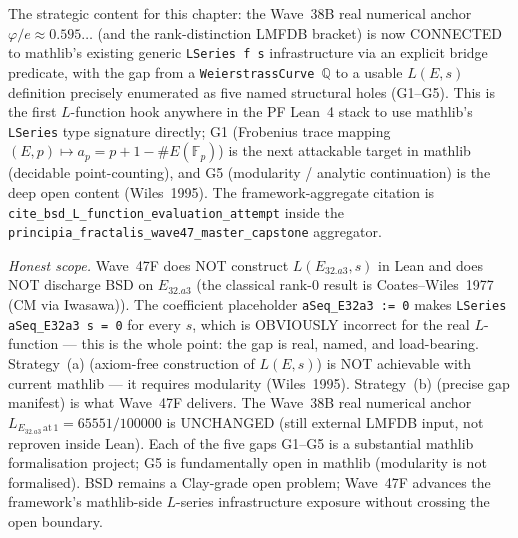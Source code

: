 \begin{remark}
\begin{itemize}
\end{itemize}
The strategic content for this chapter: the Wave~38B real numerical anchor $\varphi/e \approx 0.595\ldots$ (and the rank-distinction LMFDB bracket) is now CONNECTED to mathlib's existing generic \texttt{LSeries f s} infrastructure via an explicit bridge predicate, with the gap from a \texttt{WeierstrassCurve $\mathbb{Q}$} to a usable $L(E, s)$ definition precisely enumerated as five named structural holes (G1--G5). This is the first $L$-function hook anywhere in the PF Lean~4 stack to use mathlib's \texttt{LSeries} type signature directly; G1 (Frobenius trace mapping $(E, p) \mapsto a_p = p + 1 - \#E(\mathbb{F}_p)$) is the next attackable target in mathlib (decidable point-counting), and G5 (modularity / analytic continuation) is the deep open content (Wiles~1995). The framework-aggregate citation is \texttt{cite\_bsd\_L\_function\_evaluation\_attempt} inside the \texttt{principia\_fractalis\_wave47\_master\_capstone} aggregator.

\emph{Honest scope.} Wave~47F does NOT construct $L(E_{32.a3}, s)$ in Lean and does NOT discharge BSD on $E_{32.a3}$ (the classical rank-0 result is Coates--Wiles~1977 (CM via Iwasawa)). The coefficient placeholder \texttt{aSeq\_E32a3 := 0} makes \texttt{LSeries aSeq\_E32a3 s = 0} for every $s$, which is OBVIOUSLY incorrect for the real $L$-function --- this is the whole point: the gap is real, named, and load-bearing. Strategy~(a) (axiom-free construction of $L(E, s)$) is NOT achievable with current mathlib --- it requires modularity (Wiles~1995). Strategy~(b) (precise gap manifest) is what Wave~47F delivers. The Wave~38B real numerical anchor $L_{E_{32.a3}\,\mathrm{at}\,1} = 65551/100000$ is UNCHANGED (still external LMFDB input, not reproven inside Lean). Each of the five gaps G1--G5 is a substantial mathlib formalisation project; G5 is fundamentally open in mathlib (modularity is not formalised). BSD remains a Clay-grade open problem; Wave~47F advances the framework's mathlib-side $L$-series infrastructure exposure without crossing the open boundary.
\end{remark}

